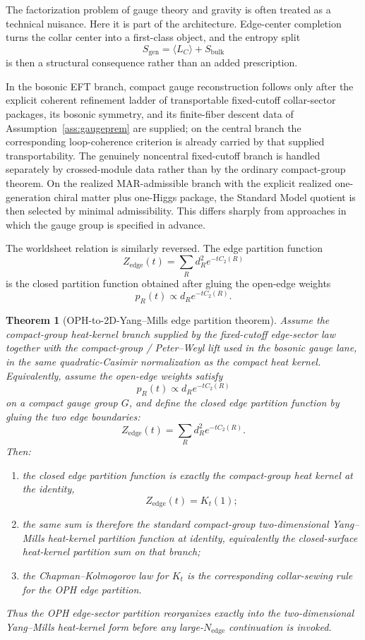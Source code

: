 \documentclass[11pt]{article}
\newtheorem{theorem}{Theorem}[section]
\begin{document}
The factorization problem of gauge theory and gravity is often treated as a technical nuisance. Here it is part of the architecture. Edge-center completion turns the collar center into a first-class object, and the entropy split
\[
S_{\mathrm{gen}}=\langle L_C\rangle + S_{\mathrm{bulk}}
\]
is then a structural consequence rather than an added prescription.

In the bosonic EFT branch, compact gauge reconstruction follows only after the explicit coherent refinement ladder of transportable fixed-cutoff collar-sector packages, its bosonic symmetry, and its finite-fiber descent data of Assumption~\ref{ass:gaugeprem} are supplied; on the central branch the corresponding loop-coherence criterion is already carried by that supplied transportability. The genuinely noncentral fixed-cutoff branch is handled separately by crossed-module data rather than by the ordinary compact-group theorem. On the realized MAR-admissible branch with the explicit realized one-generation chiral matter plus one-Higgs package, the Standard Model quotient is then selected by minimal admissibility. This differs sharply from approaches in which the gauge group is specified in advance.

The worldsheet relation is similarly reversed. The edge partition function
\[
Z_{\mathrm{edge}}(t)=\sum_R d_R^2 e^{-t C_2(R)}
\]
is the closed partition function obtained after gluing the open-edge weights
\[
p_R(t)\propto d_R e^{-tC_2(R)}.
\]

\begin{theorem}[OPH-to-2D-Yang--Mills edge partition theorem]\label{thm:edge-2dym}
Assume the compact-group heat-kernel branch supplied by the fixed-cutoff edge-sector law together
with the compact-group / Peter--Weyl lift used in the bosonic gauge lane, in the same
quadratic-Casimir normalization as the compact heat kernel. Equivalently, assume the open-edge
weights satisfy
\[
p_R(t)\propto d_R e^{-tC_2(R)}
\]
on a compact gauge group \(G\), and define the closed edge partition function by gluing the two
edge boundaries:
\[
Z_{\mathrm{edge}}(t)=\sum_R d_R^2 e^{-tC_2(R)}.
\]
Then:
\begin{enumerate}[label=\textup{(\roman*)},leftmargin=2em]
\item the closed edge partition function is exactly the compact-group heat kernel at the identity,
\[
Z_{\mathrm{edge}}(t)=K_t(1);
\]
\item the same sum is therefore the standard compact-group two-dimensional Yang--Mills
heat-kernel partition function at identity, equivalently the closed-surface heat-kernel partition
sum on that branch;
\item the Chapman--Kolmogorov law for \(K_t\) is the corresponding collar-sewing rule for the OPH
edge partition.
\end{enumerate}
Thus the OPH edge-sector partition reorganizes exactly into the two-dimensional Yang--Mills
heat-kernel form before any large-\(N_{\mathrm{edge}}\) continuation is invoked.
\end{theorem}
\end{document}
